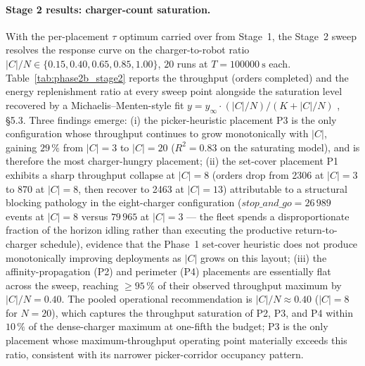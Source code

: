 \documentclass[conference]{IEEEtran}
\begin{document}
\paragraph{Stage 2 results: charger-count saturation.}
With the per-placement $\tau$ optimum carried over from Stage~1, the Stage~2 sweep resolves the response curve on the charger-to-robot ratio $|C|/N \in \{0.15, 0.40, 0.65, 0.85, 1.00\}$, $20$ runs at $T = \SI{100000}{\second}$ each. Table~\ref{tab:phase2b_stage2} reports the throughput (orders completed) and the energy replenishment ratio at every sweep point alongside the saturation level recovered by a Michaelis--Menten-style fit $y = y_\infty \cdot (|C|/N) / (K + |C|/N)$ \cite{kleijnen2015}, \S 5.3. Three findings emerge: (i) the picker-heuristic placement P3 is the only configuration whose throughput continues to grow monotonically with $|C|$, gaining $29\,\%$ from $|C| = 3$ to $|C| = 20$ ($R^2 = 0.83$ on the saturating model), and is therefore the most charger-hungry placement; (ii) the set-cover placement P1 exhibits a sharp throughput collapse at $|C| = 8$ (orders drop from 2306 at $|C|=3$ to 870 at $|C|=8$, then recover to 2463 at $|C|=13$) attributable to a structural blocking pathology in the eight-charger configuration ($\textit{stop\_and\_go} = 26\,989$ events at $|C|=8$ versus $79\,965$ at $|C|=3$ --- the fleet spends a disproportionate fraction of the horizon idling rather than executing the productive return-to-charger schedule), evidence that the Phase~1 set-cover heuristic does not produce monotonically improving deployments as $|C|$ grows on this layout; (iii) the affinity-propagation (P2) and perimeter (P4) placements are essentially flat across the sweep, reaching $\ge 95\,\%$ of their observed throughput maximum by $|C|/N = 0.40$. The pooled operational recommendation is $|C|/N \approx 0.40$ ($|C| = 8$ for $N = 20$), which captures the throughput saturation of P2, P3, and P4 within $10\,\%$ of the dense-charger maximum at one-fifth the budget; P3 is the only placement whose maximum-throughput operating point materially exceeds this ratio, consistent with its narrower picker-corridor occupancy pattern.
\end{document}
